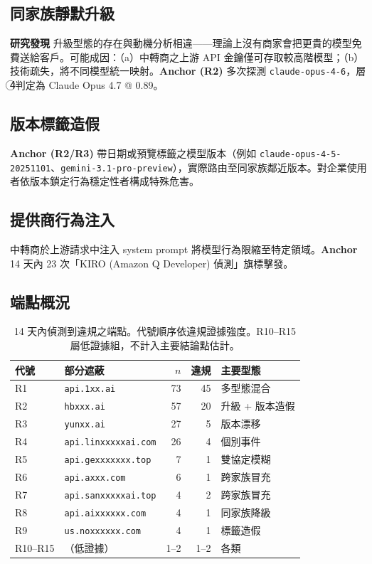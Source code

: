 \documentclass[UTF8,fontset=none,10pt,a4paper,twocolumn]{ctexart}
\begin{document}
\subsection{同家族靜默升級}
\textbf{研究發現} 升級型態的存在與動機分析相違——理論上沒有商家會把更貴的模型免費送給客戶。可能成因：（a）中轉商之上游 API 金鑰僅可存取較高階模型；（b）技術疏失，將不同模型統一映射。\textbf{Anchor (R2)} 多次探測 \texttt{claude-opus-4-6}，層\textcircled{\scriptsize 4}判定為 Claude Opus 4.7 @ 0.89。

\subsection{版本標籤造假}
\textbf{Anchor (R2/R3)} 帶日期或預覽標籤之模型版本（例如 \texttt{claude-opus-4-5-20251101}、\texttt{gemini-3.1-pro-preview}），實際路由至同家族鄰近版本。對企業使用者依版本鎖定行為穩定性者構成特殊危害。

\subsection{提供商行為注入}
中轉商於上游請求中注入 system prompt 將模型行為限縮至特定領域。\textbf{Anchor} 14 天內 23 次「KIRO (Amazon Q Developer) 偵測」旗標擊發。

\subsection{端點概況}\label{sec:endpoints}

\begin{table}[h]
\centering
\small
\begin{tabular}{@{}llrrl@{}}
\toprule
代號 & 部分遮蔽 & $n$ & 違規 & 主要型態 \\
\midrule
R1 & \texttt{api.1xx.ai} & 73 & 45 & 多型態混合 \\
R2 & \texttt{hbxxx.ai} & 57 & 20 & 升級 + 版本造假 \\
R3 & \texttt{yunxx.ai} & 27 & 5 & 版本漂移 \\
R4 & \texttt{api.linxxxxxai.com} & 26 & 4 & 個別事件 \\
R5 & \texttt{api.gexxxxxxx.top} & 7 & 1 & 雙協定模糊 \\
R6 & \texttt{api.axxx.com} & 6 & 1 & 跨家族冒充 \\
R7 & \texttt{api.sanxxxxxai.top} & 4 & 2 & 跨家族冒充 \\
R8 & \texttt{api.aixxxxxx.com} & 4 & 1 & 同家族降級 \\
R9 & \texttt{us.noxxxxxx.com} & 4 & 1 & 標籤造假 \\
R10--R15 & （低證據） & 1--2 & 1--2 & 各類 \\
\bottomrule
\end{tabular}
\caption{14 天內偵測到違規之端點。代號順序依違規證據強度。R10--R15 屬低證據組，不計入主要結論點估計。}
\label{tab:endpoints}
\end{table}
\end{document}
